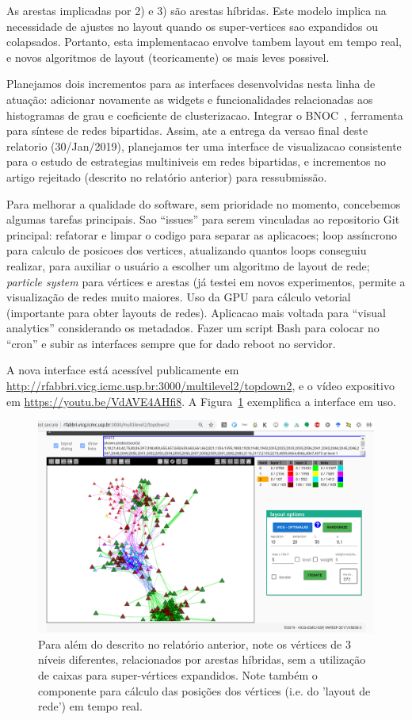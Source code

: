 \documentclass[a4paper, 11pt]{article}
\begin{document}
As arestas implicadas por 2) e 3) são arestas híbridas.
Este modelo implica na necessidade de ajustes no layout quando
os super-vertices sao expandidos ou colapsados.
Portanto, esta implementacao envolve tambem layout em tempo real,
e novos algoritmos de layout (teoricamente) os mais leves possivel.

Planejamos dois incrementos para as interfaces desenvolvidas nesta linha de atuação:
adicionar novamente as widgets e funcionalidades relacionadas aos histogramas
de grau e coeficiente de clusterizacao.
Integrar o BNOC~\cite{bnoc}, ferramenta para síntese de redes bipartidas.
Assim, ate a entrega da versao final deste relatorio (30/Jan/2019),
planejamos ter uma interface de visualizacao consistente para o estudo de estrategias
multiniveis em redes bipartidas, e incrementos no artigo rejeitado (descrito no relatório anterior)
para ressubmissão.

Para melhorar a qualidade do software, sem prioridade no momento,
concebemos algumas tarefas principais.
Sao ``issues'' para serem vinculadas ao repositorio Git principal:
refatorar e limpar o codigo para separar as aplicacoes;
loop assíncrono para calculo de posicoes dos vertices,
atualizando quantos loops conseguiu realizar, para auxiliar o usuário a escolher um algoritmo de layout de rede;
\emph{particle system} para vértices e arestas (já testei em novos experimentos, permite a visualização de redes muito maiores. Uso da GPU para cálculo vetorial (importante para obter layouts de redes).  Aplicacao mais voltada para ``visual analytics'' considerando os metadados. Fazer um script Bash para colocar no ``cron'' e subir as interfaces sempre que for dado reboot no servidor.

    A nova interface está acessível publicamente em \url{http://rfabbri.vicg.icmc.usp.br:3000/multilevel2/topdown2}, e o vídeo expositivo em \url{https://youtu.be/VdAVE4AHfi8}.
    A Figura~\ref{ml} exemplifica a interface em uso.

\begin{figure}[h!]
\centering
  \includegraphics[width=0.8\linewidth]{hybrid}
\caption{%
  Para além do descrito no relatório anterior, note os vértices de 3 níveis diferentes, relacionados por arestas
  híbridas, sem a utilização de caixas para super-vértices expandidos.
  Note também o componente para cálculo das posições dos vértices (i.e. do 'layout de rede') em tempo real.
}\label{ml}
\end{figure}
\end{document}
